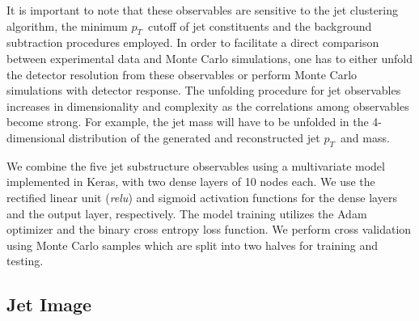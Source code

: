 \documentclass[notoc]{JHEP3}
\newcommand{\pt}{$p_{T}$}
\newcommand{\jw}{\textsc{Jewel}~}
\begin{document}
It is important to note that these observables are sensitive to the jet clustering algorithm, the minimum \pt ~cutoff of jet constituents and the background subtraction procedures employed. In order to facilitate a direct comparison between experimental data and Monte Carlo simulations, one has to either unfold the detector resolution from these observables or perform Monte Carlo simulations with detector response. The unfolding procedure for jet observables increases in dimensionality and complexity as the correlations among observables become strong. For example, the jet mass will have to be unfolded in the 4-dimensional distribution of the generated and reconstructed jet \pt ~and mass.

We combine the five jet substructure observables using a multivariate model implemented in Keras, with two dense layers of 10 nodes each. We use the rectified linear unit (\textit{relu}) and sigmoid activation functions for the dense layers and the output layer, respectively. The model training utilizes the Adam optimizer and the binary cross entropy loss function. We perform cross validation using Monte Carlo samples which are split into two halves for training and testing.


\subsection{Jet Image}
\label{sec:image}
\end{document}
